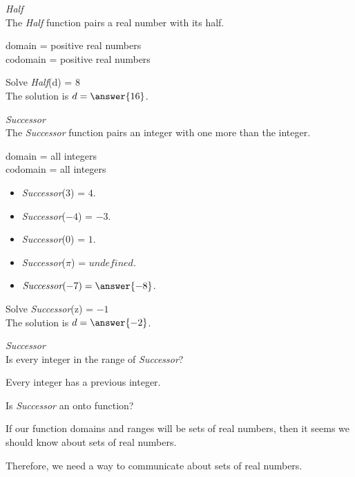 \documentclass{ximera}
\begin{document}
\begin{question} \textit{Half} \\
The \textit{Half} function pairs a real number with its half.

domain = positive real numbers  \\ 
codomain = positive real numbers


Solve \textit{Half}(d) = $8$ \\

The solution is $d = \answer{16}$.

\end{question} 




\begin{question} \textit{Successor} \\
The \textit{Successor} function pairs an integer with one more than the integer.

domain = all integers  \\ 
codomain = all integers


\begin{itemize}
\item \textit{Successor}($3$) = $4$.
\item \textit{Successor}($-4$) = $-3$.
\item \textit{Successor}($0$) = $1$.
\item \textit{Successor}($\pi$) = $undefined$.

\item $\textit{Successor}(-7) = \answer{-8}$.
\end{itemize}


Solve \textit{Successor}(z) = $-1$ \\

The solution is $d = \answer{-2}$.

\end{question} 







\begin{question} \textit{Successor} \\
Is every integer in the range of \textit{Successor}?


\begin{multipleChoice}
\end{multipleChoice}
\begin{feedback}
Every integer has a previous integer.  
\end{feedback}


Is \textit{Successor} an onto function?
\begin{multipleChoice}
\end{multipleChoice}


\end{question} 











If our function domains and ranges will be sets of real numbers, then it seems we should know about sets of real numbers.

Therefore, we need a way to communicate about sets of real numbers.
\end{document}
